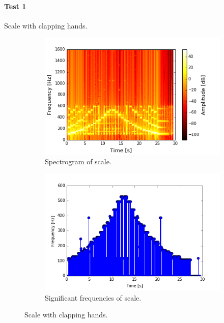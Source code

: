 \paragraph{Test 1} Scale with clapping hands.
\begin{figure}[H]
\centering
\begin{subfigure}{0.49\textwidth}
\centering
\includegraphics[width=\textwidth]{figures/validation/systemtest/final_spec.png}
\caption{Spectrogram of scale.}
\label{fig:final_spec1}
\end{subfigure}
\begin{subfigure}{0.49\textwidth}
\centering
\includegraphics[width=\textwidth]{figures/validation/systemtest/final_peak.png}
\caption{Significant frequencies of scale.}
\label{fig:final_peak1}
\end{subfigure}
\caption{Scale with clapping hands.}
\label{fig:final_1}
\end{figure} 

